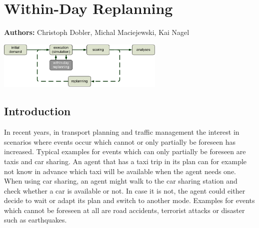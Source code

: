 \chapter{Within-Day Replanning }
\label{ch:withinday}

\hfill \textbf{Authors:} Christoph Dobler, Michal Maciejewski, Kai Nagel

\begin{center} \includegraphics[width=0.6\textwidth, angle=0]{extending/figures/WithinDayReplanning/WithinDayMATSimLoop} \end{center}


\section{Introduction}

In recent years, in transport planning and traffic management the interest in scenarios where events occur which cannot or only partially be foreseen has increased. Typical examples for events which can only partially be foreseen are taxis and car sharing. An agent that has a taxi trip in its plan can for example not know in advance which taxi will be available when the agent needs one. When using car sharing, an agent might walk to the car sharing station and check whether a car is available or not. In case it is not, the agent could either decide to wait or adapt its plan and switch to another mode. Examples for events which cannot be foreseen at all are road accidents, terrorist attacks or disaster such as earthquakes.

